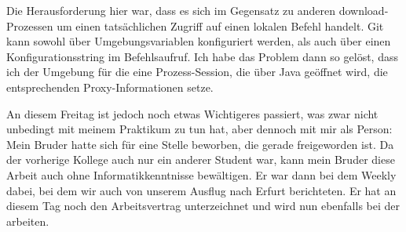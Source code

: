 Die Herausforderung hier war, dass es sich im Gegensatz zu anderen download-Prozessen um einen tatsächlichen Zugriff auf einen lokalen Befehl handelt.
Git kann sowohl über Umgebungsvariablen konfiguriert werden, als auch über einen Konfigurationsstring im Befehlsaufruf.
Ich habe das Problem dann so gelöst, dass ich der Umgebung für die eine Prozess-Session, die über Java geöffnet wird, die entsprechenden Proxy-Informationen setze.

An diesem Freitag ist jedoch noch etwas Wichtigeres passiert, was zwar nicht unbedingt mit meinem Praktikum zu tun hat, aber dennoch mit mir als Person:
Mein Bruder hatte sich für eine Stelle beworben, die gerade freigeworden ist.
Da der vorherige Kollege auch nur ein anderer Student war, kann mein Bruder diese Arbeit auch ohne Informatikkenntnisse bewältigen.
Er war dann bei dem Weekly dabei, bei dem wir auch von unserem Ausflug nach Erfurt berichteten.
Er hat an diesem Tag noch den Arbeitsvertrag unterzeichnet und wird nun ebenfalls bei der \metaeffekt arbeiten.
